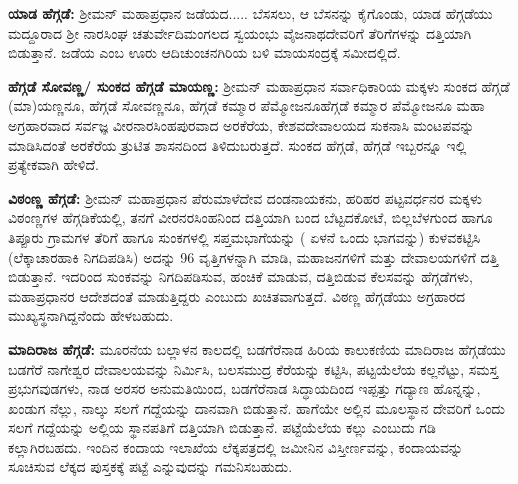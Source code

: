 \vskip 2pt

\textbf{ಯಾಡ ಹೆಗ್ಗಡೆ:} ಶ‍್ರೀಮನ್​ ಮಹಾಪ್ರಧಾನ ಜಡೆಯದ..... ಬೆಸಸಲು, ಆ ಬೆಸನನ್ನು ಕೈಗೊಂಡು, ಯಾಡ ಹೆಗ್ಗಡೆಯು ಮದ್ದೂರಾದ ಶ‍್ರೀ ನಾರಸಿಂಘ ಚತುರ್ವೇದಿಮಂಗಲದ ಸ್ವಯಂಭು ವೈಜನಾಥದೇವರಿಗೆ ತೆರಿಗೆಗಳನ್ನು ದತ್ತಿಯಾಗಿ ಬಿಡುತ್ತಾನೆ. ಜಡೆಯ ಎಂಬ ಊರು ಆದಿಚುಂಚನಗಿರಿಯ ಬಳಿ ಮಾಯಸಂದ್ರಕ್ಕೆ ಸಮೀದಲ್ಲಿದೆ.

\vskip 2pt

\textbf{ಹೆಗ್ಗಡೆ ಸೋವಣ್ಣ/ ಸುಂಕದ ಹೆಗ್ಗಡೆ ಮಾಯಣ್ಣ:} ಶ‍್ರೀಮನ್​ ಮಹಾಪ್ರಧಾನ ಸರ್ವಾಧಿಕಾರಿಯ ಮಕ್ಕಳು ಸುಂಕದ ಹೆಗ್ಗಡೆ (ಮಾ)ಯಣ್ಣನೂ, ಹೆಗ್ಗಡೆ ಸೋವಣ್ಣನೂ, ಹೆಗ್ಗಡೆ ಕಮ್ಮಾರ ಪೆಮ್ಮೋಜನೂ\index{}ಹೆಗ್ಗಡೆ ಕಮ್ಮಾರ ಪೆಮ್ಮೋಜನೂ ಮಹಾ ಅಗ್ರಹಾರವಾದ ಸರ್ವಜ್ಞ ವೀರನಾರಸಿಂಹಪುರ\-ವಾದ ಅರಕೆರೆಯ, ಕೇಶವದೇವಾಲಯದ ಸುಕನಾಸಿ ಮಂಟಪವನ್ನು ಮಾಡಿಸಿದಂತೆ ಅರಕೆರೆಯ ತ್ರುಟಿತ ಶಾಸನದಿಂದ ತಿಳಿದುಬರುತ್ತದೆ. ಸುಂಕದ ಹೆಗ್ಗಡೆ, ಹೆಗ್ಗಡೆ ಇಬ್ಬರನ್ನೂ ಇಲ್ಲಿ ಪ್ರತ್ಯೇಕವಾಗಿ ಹೇಳಿದೆ.

\vskip 2pt

\textbf{ವಿಠಂಣ್ಣ ಹೆಗ್ಗಡೆ:} ಶ‍್ರೀಮನ್​ ಮಹಾಪ್ರಧಾನ ಪೆರುಮಾಳೆದೇವ ದಂಡನಾಯಕನು, ಹರಿಹರ ಪಟ್ಟವರ್ಧನರ ಮಕ್ಕಳು ವಿಠಂಣ್ಣಗಳ ಹೆಗ್ಗಡಿಕೆಯಲ್ಲಿ, ತನಗೆ ವೀರನರಸಿಂಹನಿಂದ ದತ್ತಿಯಾಗಿ ಬಂದ ಬೆಟ್ಟದಕೋಟೆ, ಬಿಲ್ಲಬೆಳಗುಂದ ಹಾಗೂ ತಿಪ್ಪೂರು ಗ್ರಾಮಗಳ ತೆರಿಗೆ ಹಾಗೂ ಸುಂಕಗಳಲ್ಲಿ ಸಪ್ತಮಭಾಗೆಯನ್ನು ( ಏಳನೆ ಒಂದು ಭಾಗವನ್ನು) ಕುಳವಕಟ್ಟಿಸಿ (ಲೆಕ್ಕಾಚಾರಹಾಕಿ ನಿಗದಿಪಡಿಸಿ) ಅದನ್ನು 96 ವೃತ್ತಿಗಳನ್ನಾಗಿ ಮಾಡಿ, ಮಹಾಜನಗಳಿಗೆ ಮತ್ತು ದೇವಾಲಯಗಳಿಗೆ ದತ್ತಿ ಬಿಡುತ್ತಾನೆ. ಇದರಿಂದ ಸುಂಕವನ್ನು ನಿಗದಿಪಡಿಸುವ, ಹಂಚಿಕೆ ಮಾಡುವ, ದತ್ತಿಬಿಡುವ ಕೆಲಸವನ್ನು ಹೆಗ್ಗಡೆಗಳು, ಮಹಾಪ್ರಧಾನರ ಆದೇಶದಂತೆ ಮಾಡುತ್ತಿದ್ದರು ಎಂಬುದು ಖಚಿತವಾಗುತ್ತದೆ. ವಿಠಣ್ಣ ಹೆಗ್ಗಡೆಯು ಅಗ್ರಹಾರದ ಮುಖ್ಯಸ್ಥ\-ನಾಗಿದ್ದನೆಂದು ಹೇಳಬಹುದು.

\vskip 2pt

\textbf{ಮಾದಿರಾಜ ಹೆಗ್ಗಡೆ:} ಮೂರನೆಯ ಬಲ್ಲಾಳನ ಕಾಲದಲ್ಲಿ ಬಡಗೆರೆನಾಡ ಹಿರಿಯ ಕಾಲುಕಣಿಯ ಮಾದಿರಾಜ ಹೆಗ್ಗಡೆಯು ಬಡಗೆರೆ ನಾಗೇಶ್ವರ ದೇವಾಲಯವನ್ನು ನಿರ್ಮಿಸಿ, ಬಲಸಮುದ್ರ ಕೆರೆಯನ್ನು ಕಟ್ಟಿಸಿ, ಪಟ್ಟಯೆಲೆಯ ಕಲ್ಲನೆಟ್ಟು, ಸಮಸ್ತ ಪ್ರಭುಗವುಡಗಳು, ನಾಡ ಅರಸರ ಅನುಮತಿಯಿಂದ, ಬಡಗೆರೆನಾಡ ಸಿದ್ಧಾಯದಿಂದ ಇಪ್ಪತ್ತು ಗದ್ಯಾಣ ಹೊನ್ನನ್ನು, ಖಂಡುಗ ನೆಲ್ಲು, ನಾಲ್ಕು ಸಲಗೆ ಗದ್ದೆಯನ್ನು ದಾನವಾಗಿ ಬಿಡುತ್ತಾನೆ. ಹಾಗೆಯೇ ಅಲ್ಲಿನ ಮೂಲಸ್ಥಾನ ದೇವರಿಗೆ ಒಂದು ಸಲಗೆ ಗದ್ದೆಯನ್ನು ಅಲ್ಲಿಯ ಸ್ಥಾನಪತಿಗೆ ದತ್ತಿಯಾಗಿ ಬಿಡುತ್ತಾನೆ. ಪಟ್ಟೆಯೆಲೆಯ ಕಲ್ಲು ಎಂಬುದು ಗಡಿ ಕಲ್ಲಾಗಿರಬಹದು. ಇಂದಿನ ಕಂದಾಯ ಇಲಾಖೆಯ ಲೆಕ್ಕಪತ್ರದಲ್ಲಿ ಜಮೀನಿನ ವಿಸ್ತೀರ್ಣವನ್ನು, ಕಂದಾಯವನ್ನು ಸೂಚಿಸುವ ಲೆಕ್ಕದ ಪುಸ್ತಕಕ್ಕೆ ಪಟ್ಟೆ ಎನ್ನುವುದನ್ನು ಗಮನಿಸಬಹುದು.

